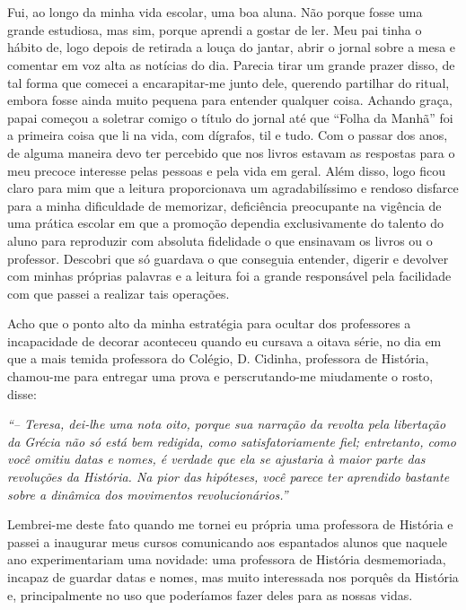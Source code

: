 \chapter{}
Fui, ao longo da minha vida escolar, uma boa aluna. 
Não porque fosse uma grande estudiosa, mas sim, porque aprendi a gostar de ler. Meu pai tinha o hábito de, logo depois de retirada a louça do jantar, abrir o jornal sobre a mesa e comentar em voz alta as notícias do dia. 
Parecia tirar um grande prazer disso, de tal forma que comecei a encarapitar-me junto dele, querendo partilhar do ritual, embora fosse ainda muito pequena para entender qualquer coisa. Achando graça, papai começou a soletrar comigo o título do jornal até que ``Folha da Manhã'' foi a primeira coisa que li na vida, com dígrafos, til e tudo. 
Com o passar dos anos, de alguma maneira devo ter percebido que nos livros estavam as respostas para o meu precoce interesse pelas pessoas e pela vida em geral. 
Além disso, logo ficou claro para mim que a leitura proporcionava um agradabilíssimo e rendoso disfarce para a minha dificuldade de memorizar, deficiência preocupante na vigência de uma prática escolar em que a promoção dependia exclusivamente do talento do aluno para reproduzir com absoluta fidelidade o que ensinavam os livros ou o professor. 
Descobri que só guardava o que conseguia entender, digerir e devolver com minhas próprias palavras e a leitura foi a grande responsável pela facilidade com que passei a realizar tais operações. 

Acho que o ponto alto da minha estratégia para ocultar dos professores a incapacidade de decorar aconteceu quando eu cursava a oitava série, no dia em que a mais temida professora do Colégio, D. Cidinha, professora de História, chamou-me para entregar uma prova e perscrutando-me miudamente o rosto, disse:
 
{\itshape``-- Teresa, dei-lhe uma nota oito, porque sua narração da revolta pela libertação da Grécia não só está bem redigida, como satisfatoriamente fiel; entretanto, como você omitiu datas e nomes, é verdade que ela se ajustaria à maior parte das revoluções da História. Na pior das hipóteses, você parece ter aprendido bastante sobre a dinâmica dos movimentos revolucionários.''}

Lembrei-me deste fato quando me tornei eu própria uma professora de História e passei a inaugurar meus cursos comunicando aos espantados alunos que naquele ano experimentariam uma novidade: uma professora de História desmemoriada, incapaz de guardar datas e nomes, mas muito interessada nos porquês da História e, principalmente no uso que poderíamos fazer deles para as nossas vidas. 

